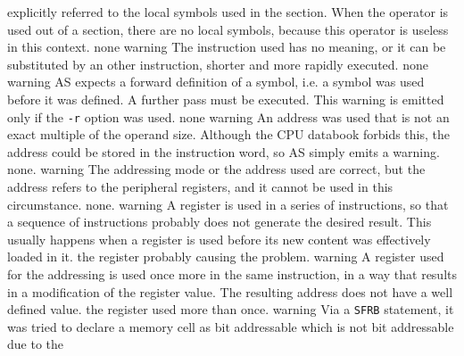 \documentclass[12pt,twoside]{report}
\newcommand{\tty}[1]{{\tt #1}}
\begin{document}
\begin{description}
{                explicitly referred to the local symbols used in the
                section. When the operator is used out of a section, there
                are no local symbols, because this operator is useless in
                this context.}
               {none}
               {warning}
               {The instruction used has no meaning, or it can be
                substituted by an other instruction, shorter and more
                rapidly executed.}
               {none}
               {warning}
               {AS expects a forward definition of a symbol, i.e. a symbol
                was used before it was defined. A further pass must be
                executed. This warning is emitted only if the \tty{-r} option was
                used.}
               {none}
               {warning}
               {An address was used that is not an exact multiple of the
                operand size. Although the CPU databook forbids this, the
                address could be stored in the instruction word, so AS
                simply emits a warning.}
               {none.}
               {warning}
               {The addressing mode or the address used are correct, but the
                address refers to the peripheral registers, and it
                cannot be used in this circumstance.}
               {none.}
               {warning}
               {A register is used in a series of instructions, so that a
                sequence of instructions probably does not generate the
                desired result. This usually happens when a register is
                used before its new content was effectively loaded in it.}
               {the register probably causing the problem.}
               {warning}
               {A register used for the addressing is used once more in the
                same instruction, in a way that results in a modification
                of the register value. The resulting address does not have a
                well defined value.}
               {the register used more than once.}
               {warning}
               {Via a \tty{SFRB} statement, it was tried to declare a memory cell
                as bit addressable which is not bit addressable due to the
}
\end{description}
\end{document}
